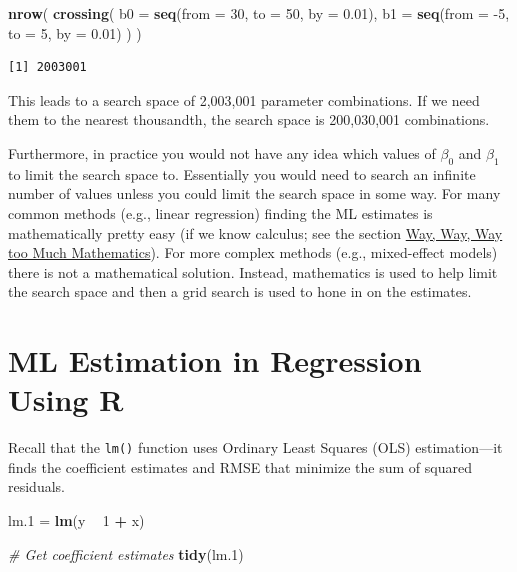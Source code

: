 \documentclass[]{book}
\newenvironment{Shaded}{\begin{snugshade}}{\end{snugshade}}
\newcommand{\CommentTok}[1]{\textcolor[rgb]{0.56,0.35,0.01}{\textit{#1}}}
\newcommand{\DataTypeTok}[1]{\textcolor[rgb]{0.13,0.29,0.53}{#1}}
\newcommand{\DecValTok}[1]{\textcolor[rgb]{0.00,0.00,0.81}{#1}}
\newcommand{\FloatTok}[1]{\textcolor[rgb]{0.00,0.00,0.81}{#1}}
\newcommand{\KeywordTok}[1]{\textcolor[rgb]{0.13,0.29,0.53}{\textbf{#1}}}
\newcommand{\NormalTok}[1]{#1}
\newcommand{\OperatorTok}[1]{\textcolor[rgb]{0.81,0.36,0.00}{\textbf{#1}}}
\newcommand{\StringTok}[1]{\textcolor[rgb]{0.31,0.60,0.02}{#1}}
\begin{document}
\begin{Shaded}
\begin{Highlighting}[]
\KeywordTok{nrow}\NormalTok{(}
  \KeywordTok{crossing}\NormalTok{(}
    \DataTypeTok{b0 =} \KeywordTok{seq}\NormalTok{(}\DataTypeTok{from =} \DecValTok{30}\NormalTok{, }\DataTypeTok{to =} \DecValTok{50}\NormalTok{, }\DataTypeTok{by =} \FloatTok{0.01}\NormalTok{),}
    \DataTypeTok{b1 =} \KeywordTok{seq}\NormalTok{(}\DataTypeTok{from =} \DecValTok{-5}\NormalTok{, }\DataTypeTok{to =} \DecValTok{5}\NormalTok{, }\DataTypeTok{by =} \FloatTok{0.01}\NormalTok{)}
\NormalTok{  )}
\NormalTok{)}
\end{Highlighting}
\end{Shaded}

\begin{verbatim}
[1] 2003001
\end{verbatim}

This leads to a search space of 2,003,001 parameter combinations. If we need them to the nearest thousandth, the search space is 200,030,001 combinations.

Furthermore, in practice you would not have any idea which values of \(\beta_0\) and \(\beta_1\) to limit the search space to. Essentially you would need to search an infinite number of values unless you could limit the search space in some way. For many common methods (e.g., linear regression) finding the ML estimates is mathematically pretty easy (if we know calculus; see the section \protect\hyperlink{way-too-much-math}{Way, Way, Way too Much Mathematics}). For more complex methods (e.g., mixed-effect models) there is not a mathematical solution. Instead, mathematics is used to help limit the search space and then a grid search is used to hone in on the estimates.

\hypertarget{ml-estimation-in-regression-using-r}{%
\section{ML Estimation in Regression Using R}\label{ml-estimation-in-regression-using-r}}

Recall that the \texttt{lm()} function uses Ordinary Least Squares (OLS) estimation---it finds the coefficient estimates and RMSE that minimize the sum of squared residuals.

\begin{Shaded}
\begin{Highlighting}[]
\NormalTok{lm}\FloatTok{.1}\NormalTok{ =}\StringTok{ }\KeywordTok{lm}\NormalTok{(y }\OperatorTok{~}\StringTok{ }\DecValTok{1} \OperatorTok{+}\StringTok{ }\NormalTok{x)}

\CommentTok{# Get coefficient estimates}
\KeywordTok{tidy}\NormalTok{(lm}\FloatTok{.1}\NormalTok{)}
\end{Highlighting}
\end{Shaded}
\end{document}
